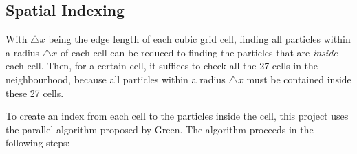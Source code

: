 \subsection{Spatial Indexing}
\label{subsection spatial indexing}
With $\triangle x$ being the edge length of each cubic grid cell, finding all particles within a radius $\triangle x$ of each cell can be reduced to finding the particles that are \textit{inside} each cell. Then, for a certain cell, it suffices to check all the 27 cells in the neighbourhood, because all particles within a radius $\triangle x$ must be contained inside these 27 cells. 


To create an index from each cell to the particles inside the cell, this project uses the parallel algorithm proposed by Green\cite{green2008cuda}. The algorithm proceeds in the following steps:


